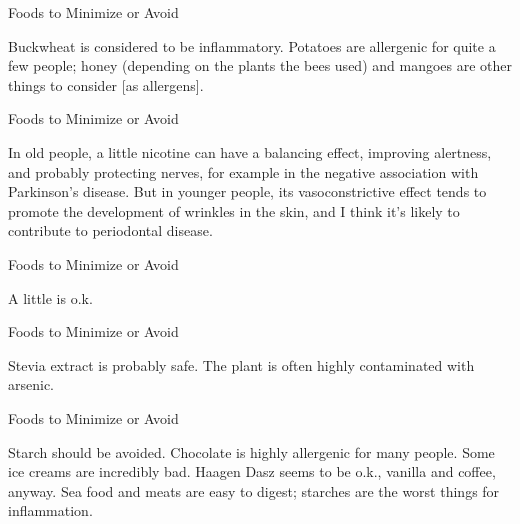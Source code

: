 \documentclass[11pt,oneside,openany,extrafontsizes]{memoir}
\begin{document}
\begin{standalonequote}{Foods to Minimize or Avoid}

    \begin{answer}
        Buckwheat is considered to be inflammatory. Potatoes are allergenic for quite a few people; honey (depending on the plants the bees used) and mangoes are other things to consider [as allergens].
    \end{answer}
\end{standalonequote}

\begin{standalonequote}{Foods to Minimize or Avoid}

    \begin{answer}
        In old people, a little nicotine can have a balancing effect, improving alertness, and probably protecting nerves, for example in the negative association with Parkinson's disease. But in younger people, its vasoconstrictive effect tends to promote the development of wrinkles in the skin, and I think it's likely to contribute to periodontal disease.
    \end{answer}
\end{standalonequote}

\begin{standalonequote}{Foods to Minimize or Avoid}

    \begin{answer}
        A little is o.k.
    \end{answer}
\end{standalonequote}

\begin{standalonequote}{Foods to Minimize or Avoid}

    \begin{answer}
        Stevia extract is probably safe. The plant is often highly contaminated with arsenic.
    \end{answer}
\end{standalonequote}

\begin{standalonequote}{Foods to Minimize or Avoid}

    \begin{answer}
      Starch should be avoided. Chocolate is highly allergenic for many people. Some ice creams are incredibly bad. Haagen Dasz seems to be o.k., vanilla and coffee, anyway. Sea food and meats are easy to digest; starches are the worst things for inflammation.
    \end{answer}
\end{standalonequote}
\end{document}
